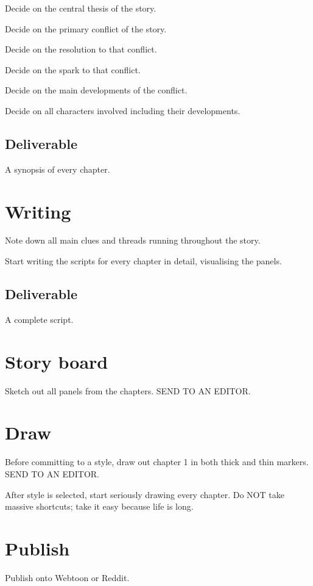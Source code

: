\documentclass[11pt]{article}
\begin{document}
		Decide on the central thesis of the story.
		
		Decide on the primary conflict of the story.
		
		Decide on the resolution to that conflict.
		
		Decide on the spark to that conflict.
		
		Decide on the main developments of the conflict.
		
		Decide on all characters involved including their developments.
		
	\subsection{Deliverable}
		A synopsis of every chapter.
		
\section{Writing}
	Note down all main clues and threads running throughout the story.
	
	Start writing the scripts for every chapter in detail, visualising the panels.
	
	\subsection{Deliverable}
	A complete script.

\section{Story board}
Sketch out all panels from the chapters. SEND TO AN EDITOR.

\section{Draw}
Before committing to a style, draw out chapter 1 in both thick and thin markers. SEND TO AN EDITOR.

After style is selected, start seriously drawing every chapter. Do NOT take massive shortcuts; take it easy because life is long.

\section{Publish}
Publish onto Webtoon or Reddit.

\newpage


	
\end{document}
